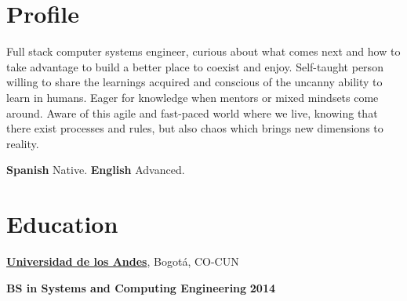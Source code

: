 \section{Profile}
Full stack computer systems engineer, curious about what comes next and how to
take advantage to build a better place to coexist and enjoy.
Self-taught person willing to share
the learnings acquired and
conscious of the uncanny ability to learn in humans. Eager for knowledge when
mentors or mixed mindsets come around.
Aware of this agile and fast-paced world where we live, knowing that there exist
processes and rules, but also chaos which brings new dimensions to reality.

\vspace{3.5mm}
\textbf{Spanish} Native. \textbf{English} Advanced.
%

%

\section{Education}
%
% 
% 
\href{http://www.topuniversities.com/node/2823/ranking-details/latin-american-university-rankings/2014}{\textbf{Universidad de los Andes}},
Bogot\'{a}, CO-CUN
\begin{outerlist}
\item[\FA \faAngleDoubleRight] \textbf{BS in Systems and Computing Engineering}
\hfill \textbf{2014}
\end{outerlist}

